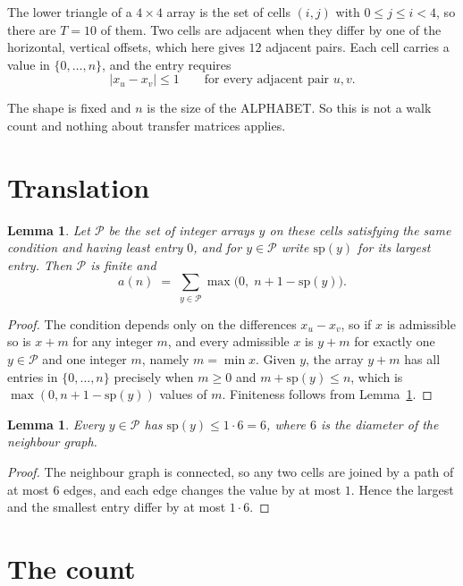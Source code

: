 \documentclass[11pt,a4paper]{article}
\theoremstyle{plain}
\newtheorem{lemma}[theorem]{Lemma}
\theoremstyle{definition}
\begin{document}
The lower triangle of a $4\times4$ array is the set of cells $(i,j)$ with $0\le j\le
i<4$, so there are $T=10$ of them. Two cells are adjacent when they differ by one of the
horizontal, vertical offsets, which here gives $12$ adjacent pairs. Each cell carries a value in
$\{0,\dots,n\}$, and the entry requires
\[
|x_u-x_v|\le 1\qquad\text{for every adjacent pair }u,v .
\]

The shape is fixed and $n$ is the size of the ALPHABET. So this is not a walk count and
nothing about transfer matrices applies.

\section{Translation}

\begin{lemma}\label{lem:trans}
Let $\mathcal P$ be the set of integer arrays $y$ on these cells satisfying the same condition
and having least entry $0$, and for $y\in\mathcal P$ write $\mathrm{sp}(y)$ for its largest
entry. Then $\mathcal P$ is finite and
\[
a(n)\;=\;\sum_{y\in\mathcal P}\max\bigl(0,\;n+1-\mathrm{sp}(y)\bigr).
\]
\end{lemma}

\begin{proof}
The condition depends only on the differences $x_u-x_v$, so if $x$ is admissible so is $x+m$
for any integer $m$, and every admissible $x$ is $y+m$ for exactly one $y\in\mathcal P$ and one
integer $m$, namely $m=\min x$. Given $y$, the array $y+m$ has all entries in
$\{0,\dots,n\}$ precisely when $m\ge0$ and $m+\mathrm{sp}(y)\le n$, which is
$\max(0,n+1-\mathrm{sp}(y))$ values of $m$. Finiteness follows from
Lemma~\ref{lem:bound}.
\end{proof}

\begin{lemma}\label{lem:bound}
Every $y\in\mathcal P$ has $\mathrm{sp}(y)\le 1\cdot6=6$, where $6$ is the
diameter of the neighbour graph.
\end{lemma}

\begin{proof}
The neighbour graph is connected, so any two cells are joined by a path of at most $6$
edges, and each edge changes the value by at most $1$. Hence the largest and the smallest
entry differ by at most $1\cdot6$.
\end{proof}

\section{The count}
\end{document}
